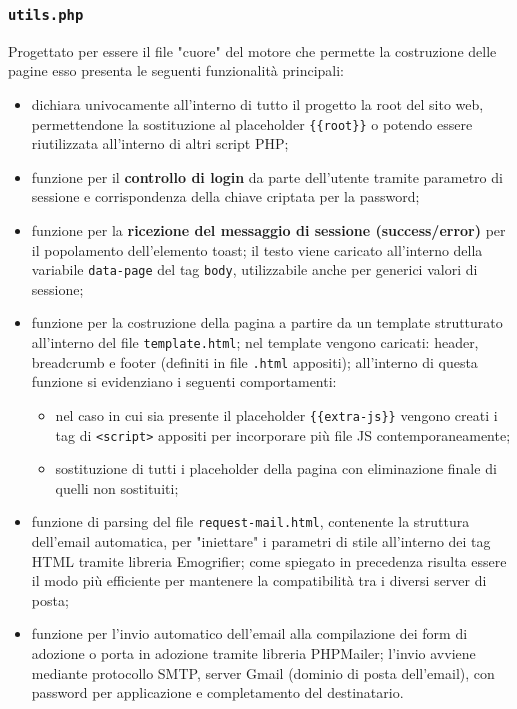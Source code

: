 \documentclass[a4paper,10pt]{article}
\begin{document}
	\subsubsection{\texttt{utils.php}}
	Progettato per essere il file "cuore" del motore che permette la costruzione delle pagine esso presenta le seguenti funzionalità principali:
	\begin{itemize}
		\item dichiara univocamente all'interno di tutto il progetto la root del sito web, permettendone la sostituzione al placeholder \texttt{\{\{root\}\}} o potendo essere riutilizzata all'interno di altri script PHP;
		\item funzione per il \textbf{controllo di login} da parte dell'utente tramite parametro di sessione e corrispondenza della chiave criptata per la password;
		\item funzione per la \textbf{ricezione del messaggio di sessione (success/error)} per il popolamento dell'elemento toast; il testo viene caricato all'interno della variabile \texttt{data-page} del tag \texttt{body}, utilizzabile anche per generici valori di sessione;
		\item funzione per la costruzione della pagina a partire da un template strutturato all'interno del file \texttt{template.html}; nel template vengono caricati: header, breadcrumb e footer (definiti in file \texttt{.html} appositi); all'interno di questa funzione si evidenziano i seguenti comportamenti:
		\begin{itemize}
			\item nel caso in cui sia presente il placeholder \texttt{\{\{extra-js\}\}} vengono creati i tag di \texttt{<script>} appositi per incorporare più file JS contemporaneamente;
			\item sostituzione di tutti i placeholder della pagina con eliminazione finale di quelli non sostituiti;
		\end{itemize}
		\item funzione di parsing del file \texttt{request-mail.html}, contenente la struttura dell'email automatica, per "iniettare" i parametri di stile all'interno dei tag HTML tramite libreria Emogrifier; come spiegato in precedenza risulta essere il modo più efficiente per mantenere la compatibilità tra i diversi server di posta;
		\item \label{email}funzione per l'invio automatico dell'email alla compilazione dei form di adozione o porta in adozione tramite libreria PHPMailer; l'invio avviene mediante protocollo SMTP, server Gmail (dominio di posta dell'email), con password per applicazione e completamento del destinatario.
	\end{itemize}
\end{document}

